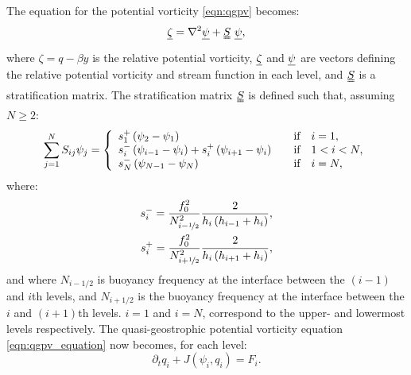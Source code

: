 \documentclass[a4paper]{book}
\begin{document}
The equation for the potential vorticity \eqref{eqn:qgpv} becomes:
\begin{equation}\label{eqn:zeta_layered}
  \uline{\zeta} = \nabla^2 \uline{\psi} + \uuline{S}~\uline{\psi},
\end{equation}
where $\zeta = q - \beta y$ is the relative potential vorticity,
$\uline{\zeta}$ and $\uline{\psi}$ are vectors defining the relative potential
vorticity and stream function in each level, and $\uuline{S}$ is a stratification matrix.
The stratification matrix $\uuline{S}$ is defined such that, assuming $N \ge 2$:
\begin{equation}
  \sum_{j = 1}^{N} S_{ij} \psi_j = \left\{ \begin{array}{l l}s_1^{+} \left( \psi_2 - \psi_1 \right)                                                     & \quad \textrm{if} \quad i = 1, \\
                                                           s_i^{-} \left( \psi_{i - 1} - \psi_i \right) + s_i^{+} \left( \psi_{i + 1} - \psi_i \right)  & \quad \textrm{if} \quad 1 < i < N, \\
                                                           s_N^{-} \left( \psi_{N - 1} - \psi_N \right)                                                 & \quad \textrm{if} \quad i = N,
                                           \end{array} \right.
\end{equation}
where:
\begin{align}\label{eqn:stratification_parameters}
  s_i^{-} = \frac{f_0^2}{N_{i - \nicefrac{1}{2}}^2} \frac{2}{h_i \left( h_{i - 1} + h_i \right)}, \nonumber \\
  s_i^{+} = \frac{f_0^2}{N_{i + \nicefrac{1}{2}}^2} \frac{2}{h_i \left( h_{i + 1} + h_i \right)},
\end{align}
and where $N_{i - 1 / 2}$ is buoyancy frequency at the interface
between the $\left( i - 1 \right)$ and $i$th levels, and $N_{i + 1 / 2}$ is the
buoyancy frequency at the interface between the $i$ and $\left( i + 1 \right)$th
levels. $i = 1$ and $i = N$, correspond to the upper- and lowermost levels
respectively. The quasi-geostrophic potential vorticity equation
\eqref{eqn:qgpv_equation} now becomes, for each level:
\begin{equation}\label{eqn:qgpv_layered}
  \partial_t q_i + J(\psi_i, q_i) = F_i.
\end{equation}
\end{document}
